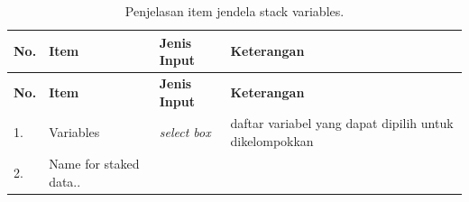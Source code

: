 \documentclass[12pt,]{krantz}
\begin{document}
\begin{longtable}[]{@{}llll@{}}
\caption{\label{tab:stack} Penjelasan item jendela stack variables.}\tabularnewline
\toprule
\begin{minipage}[b]{0.04\columnwidth}\raggedright
\textbf{No.}\strut
\end{minipage} & \begin{minipage}[b]{0.14\columnwidth}\raggedright
\textbf{Item}\strut
\end{minipage} & \begin{minipage}[b]{0.09\columnwidth}\raggedright
\textbf{Jenis Input}\strut
\end{minipage} & \begin{minipage}[b]{0.61\columnwidth}\raggedright
\textbf{Keterangan}\strut
\end{minipage}\tabularnewline
\midrule
\endfirsthead
\toprule
\begin{minipage}[b]{0.04\columnwidth}\raggedright
\textbf{No.}\strut
\end{minipage} & \begin{minipage}[b]{0.14\columnwidth}\raggedright
\textbf{Item}\strut
\end{minipage} & \begin{minipage}[b]{0.09\columnwidth}\raggedright
\textbf{Jenis Input}\strut
\end{minipage} & \begin{minipage}[b]{0.61\columnwidth}\raggedright
\textbf{Keterangan}\strut
\end{minipage}\tabularnewline
\midrule
\endhead
\begin{minipage}[t]{0.04\columnwidth}\raggedright
1.\strut
\end{minipage} & \begin{minipage}[t]{0.14\columnwidth}\raggedright
Variables\strut
\end{minipage} & \begin{minipage}[t]{0.09\columnwidth}\raggedright
\emph{select box}\strut
\end{minipage} & \begin{minipage}[t]{0.61\columnwidth}\raggedright
daftar variabel yang dapat dipilih untuk dikelompokkan\strut
\end{minipage}\tabularnewline
\begin{minipage}[t]{0.04\columnwidth}\raggedright
2.\strut
\end{minipage} & \begin{minipage}[t]{0.14\columnwidth}\raggedright
Name for staked data..\strut
\end{minipage} & \begin{minipage}[t]{0.09\columnwidth}\raggedright

\end{minipage}
\end{longtable}
\end{document}
